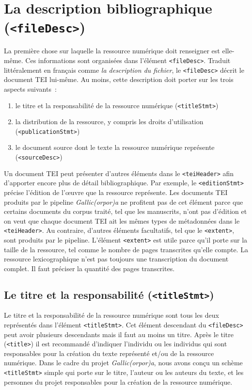 \documentclass[class=article, crop=false]{standalone}
\begin{document}
\section{La description bibliographique (\texttt{<fileDesc>})}
La première chose sur laquelle la ressource numérique doit renseigner est elle-même. Ces informations sont organisées dans l'élément \texttt{<fileDesc>}. Traduit littéralement en français comme \textit{la description du fichier}, le \texttt{<fileDesc>} décrit le document \acrshort{TEI} lui-même. Au moins, cette description doit porter sur les trois aspects suivants~:
\begin{enumerate}
\item le titre et la responsabilité de la ressource numérique (\texttt{<titleStmt>})
\item la distribution de la ressource, y compris les droits d'utilisation (\texttt{<publicationStmt>})
\item le document source dont le texte la ressource numérique représente (\texttt{<sourceDesc>})
\end{enumerate}
Un document \acrshort{TEI} peut présenter d'autres éléments dans le \texttt{<teiHeader>} afin d'apporter encore plus de détail bibliographique. Par exemple, le \texttt{<editionStmt>} précise l'édition de l'œuvre que la ressource représente. Les documents \acrshort{TEI} produits par le pipeline \textit{Gallic(orpor)a} ne profitent pas de cet élément parce que certains documents du corpus traité, tel que les manuscrits, n'ont pas d'édition et on veut que chaque document \acrshort{TEI} ait les mêmes types de métadonnées dans le \texttt{<teiHeader>}. Au contraire, d'autres éléments facultatifs, tel que le \texttt{<extent>}, sont produits par le pipeline. L'élément \texttt{<extent>} est utile parce qu'il porte sur la taille de la ressource, tel comme le nombre de pages transcrites qu'elle compte. La ressource lexicographique n'est pas toujours une transcription du document complet. Il faut préciser la quantité des pages transcrites.

\subsection{Le titre et la responsabilité (\texttt{<titleStmt>})}
Le titre et la responsabilité de la ressource numérique sont tous les deux représentés dans l'élément \texttt{<titleStmt>}. Cet élément descendant du \texttt{<fileDesc>} peut avoir plusieurs descendants mais il faut au moins un titre. Après le titre (\texttt{<title>}) il est recommandé d'indiquer l'individu ou les individus qui sont responsables pour la création du texte représenté et/ou de la ressource numérique. Dans le cadre du projet \textit{Gallic(orpor)a}, nous avons conçu un schème \texttt{<titleStmt>} simple qui porte sur le titre, l'auteur ou les auteurs du texte, et les personnes du projet responsables pour la création de la ressource numérique.
\end{document}

